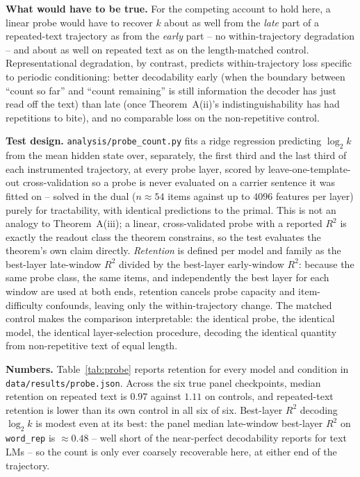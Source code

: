 \documentclass[11pt]{article}
\begin{document}
\textbf{What would have to be true.} For the competing account to hold here, a
linear probe would have to recover $k$ about as well from the \emph{late}
part of a repeated-text trajectory as from the \emph{early} part -- no
within-trajectory degradation -- and about as well on repeated text as on the
length-matched control. Representational degradation, by contrast, predicts
within-trajectory loss specific to periodic conditioning: better decodability
early (when the boundary between ``count so far'' and ``count remaining'' is
still information the decoder has just read off the text) than late (once
Theorem~A(ii)'s indistinguishability has had repetitions to bite), and no
comparable loss on the non-repetitive control.

\textbf{Test design.} \texttt{analysis/probe\_count.py} fits a ridge
regression predicting $\log_2 k$ from the mean hidden state over,
separately, the first third and the last third of each instrumented
trajectory, at every probe layer, scored by leave-one-template-out
cross-validation so a probe is never evaluated on a carrier sentence it was
fitted on -- solved in the dual ($n\approx54$ items against up to $4096$
features per layer) purely for tractability, with identical predictions to
the primal. This is not an analogy to Theorem~A(iii); a linear, cross-validated
probe with a reported $R^2$ is exactly the readout class the theorem
constrains, so the test evaluates the theorem's own claim directly.
\emph{Retention} is defined per model and family as the best-layer late-window
$R^2$ divided by the best-layer early-window $R^2$: because the same probe
class, the same items, and independently the best layer for each window are
used at both ends, retention cancels probe capacity and item-difficulty
confounds, leaving only the within-trajectory change. The matched control
makes the comparison interpretable: the identical probe, the identical model,
the identical layer-selection procedure, decoding the identical quantity from
non-repetitive text of equal length.

\textbf{Numbers.} Table~\ref{tab:probe} reports retention for every model and
condition in \texttt{data/results/probe.json}. Across the six true panel
checkpoints, median retention on repeated text is $0.97$ against $1.11$ on
controls, and repeated-text retention is lower than its own control in all six
of six. Best-layer $R^2$ decoding $\log_2 k$ is modest even at its best: the
panel median late-window best-layer $R^2$ on \texttt{word\_rep} is
$\approx0.48$ -- well short of the near-perfect decodability
\cite{venkatesh2026repeated} reports for text LMs -- so the count is only
ever coarsely recoverable here, at either end of the trajectory.
\end{document}

